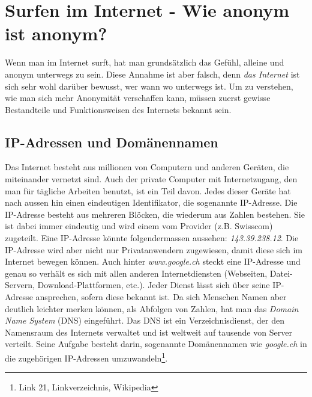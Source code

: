 \section{Surfen im Internet - Wie anonym ist anonym?}
Wenn man im Internet surft, hat man grundsätzlich das Gefühl, alleine und anonym unterwegs zu sein.
Diese Annahme ist aber falsch, denn \textit{das Internet} ist sich sehr wohl darüber bewusst, wer wann wo unterwegs ist. Um zu verstehen, wie man sich  mehr Anonymität verschaffen kann, müssen zuerst gewisse Bestandteile und Funktionsweisen des Internets bekannt sein.

\subsection{IP-Adressen und Domänennamen}
Das Internet besteht aus millionen von Computern und anderen Geräten, die miteinander vernetzt sind.
Auch der private Computer mit Internetzugang, den man für tägliche Arbeiten benutzt, ist ein Teil davon.
Jedes dieser Geräte hat nach aussen hin einen eindeutigen Identifikator, die sogenannte IP-Adresse.
Die IP-Adresse besteht aus mehreren Blöcken, die wiederum aus Zahlen bestehen.
Sie ist dabei immer eindeutig und wird einem vom Provider (z.B. Swisscom) zugeteilt.
Eine IP-Adresse könnte folgendermassen aussehen: \textit{143.39.238.12}.
Die IP-Adresse wird aber nicht nur Privatanwendern zugewiesen, damit diese sich im Internet bewegen können.
Auch hinter \textit{www.google.ch} steckt eine IP-Adresse und genau so verhält es sich mit allen anderen Internetdiensten (Webseiten, Datei-Servern, Download-Plattformen, etc.).
Jeder Dienst lässt sich über seine IP-Adresse ansprechen, sofern diese bekannt ist.
Da sich Menschen Namen aber deutlich leichter merken können, als Abfolgen von Zahlen, hat man das \textit{Domain Name System} (DNS) eingeführt.
Das DNS ist ein Verzeichnisdienst, der den Namensraum des Internets verwaltet und ist weltweit auf tausende von Server verteilt.
Seine Aufgabe besteht darin, sogenannte Domänennamen wie \textit{google.ch} in die zugehörigen IP-Adressen umzuwandeln\footnote{Link 21, Linkverzeichnis, Wikipedia}.

